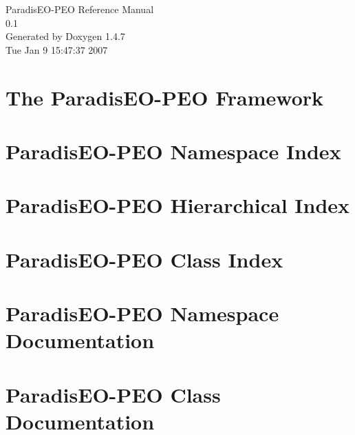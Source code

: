 \documentclass[a4paper]{book}
\begin{document}
\begin{titlepage}
\vspace*{7cm}
\begin{center}
{\Large Paradis\-EO-PEO Reference Manual\\[1ex]\large 0.1 }\\
\vspace*{1cm}
{\large Generated by Doxygen 1.4.7}\\
\vspace*{0.5cm}
{\small Tue Jan 9 15:47:37 2007}\\
\end{center}
\end{titlepage}
\clearemptydoublepage
{}
\tableofcontents
\clearemptydoublepage
{}
\chapter{The Paradis\-EO-PEO Framework }
\label{index}\hypertarget{index}{}
\chapter{Paradis\-EO-PEO Namespace Index}

\chapter{Paradis\-EO-PEO Hierarchical Index}

\chapter{Paradis\-EO-PEO Class Index}

\chapter{Paradis\-EO-PEO Namespace Documentation}

\chapter{Paradis\-EO-PEO Class Documentation}
























\printindex
\end{document}
